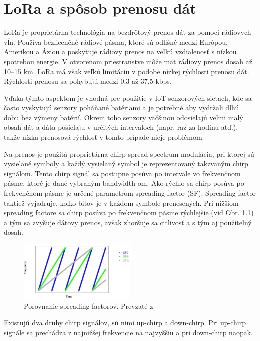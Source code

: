 \documentclass[slovak,master]{diploma}
\begin{document}
\chapter{LoRa a spôsob prenosu dát}
LoRa je proprietárna technológia na bezdrôtový prenos dát za pomoci rádiovych vĺn.
Používa bezlicenčné rádiové pásma, ktoré sú odlišné medzi Európou, Amerikou a Áziou a poskytuje rádiovy prenos na veľkú vzdialenosť s nízkou spotrebou energie.
V otvorenom priestranstve môže mať rádiovy prenos dosah až 10--15 km. LoRa má však veľkú limitáciu v podobe nízkej rýchlosti prenosu dát.
Rýchlosti prenosu sa pohybujú medzi 0,3 až 37,5 kbps.

Vďaka týmto aspektom je vhodná pre použitie v IoT senzorových sieťach, kde sa často vyskytujú senzory poháňané batériami a je potrebné aby vydržali dlhú dobu 
bez výmeny batérií. Okrem toho senzory väčšinou odosielajú veľmi malý obsah dát a dáta posielaju v určitých intervaloch (napr. raz za hodinu atď.), 
takže nízka prenosová rýchlosť v tomto prípade nieje problémom.

Na prenos je použitá proprietárna chirp spread-spectrum modulácia, pri ktorej sú 
vysielané symboly a každý vysielaný symbol je reprezentovaný takzvaným chirp signálom. Tento chirp signál sa postupne posúva po intervale 
vo frekvenčnom pásme, ktoré je dané vybraným bandwidth-om. 
Ako rýchlo sa chirp posúva po frekvenčnom pásme je určené parametrom spreading factor (SF). Spreading factor taktiež vyjadruje, kolko bitov je v každom 
symbole prenesených. Pri nižšiom spreading factore sa chirp posúva po frekvenčnom pásme rýchlejšie (viď Obr. \ref{fig:spreadingfactors}) a tým sa zvyšuje dátovy prenos, 
avšak zhoršuje sa citlivosť a s tým aj použitelný dosah.

\begin{figure}
	\centering
	\includegraphics[width=0.5\textwidth]{Figures/spreading factors.png}
	\caption{Porovnanie spreading factorov. Prevzaté z \cite{spreadfactorimage}}
	\label{fig:spreadingfactors}
\end{figure}
\newpage

Existujú dva druhy chirp signálov, sú nimi up-chirp a down-chirp. Pri up-chirp signále sa prechádza z najnižšej frekvencie na najvyššiu a pri 
down-chirp naopak.
\end{document}
